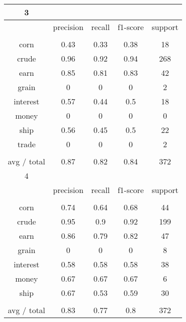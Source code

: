 \documentclass[11pt]{article}
\begin{document}
\begin{center}
\begin{longtable}{| c | c | c | c | c |}
3           &           &        &          &         \\
\hline
           & precision & recall & f1-score & support \\
           &           &        &          &         \\
corn        & 0.43      & 0.33   & 0.38     & 18      \\
crude       & 0.96      & 0.92   & 0.94     & 268     \\
earn        & 0.85      & 0.81   & 0.83     & 42      \\
grain       & 0         & 0      & 0        & 2       \\
interest    & 0.57      & 0.44   & 0.5      & 18      \\
money       & 0         & 0      & 0        & 0       \\
ship        & 0.56      & 0.45   & 0.5      & 22      \\
trade       & 0         & 0      & 0        & 2       \\
           &           &        &          &         \\
avg / total & 0.87      & 0.82   & 0.84     & 372     \\
\hline

4           &           &        &          &         \\
\hline
           & precision & recall & f1-score & support \\
           &           &        &          &         \\
corn        & 0.74      & 0.64   & 0.68     & 44      \\
crude       & 0.95      & 0.9    & 0.92     & 199     \\
earn        & 0.86      & 0.79   & 0.82     & 47      \\
grain       & 0         & 0      & 0        & 8       \\
interest    & 0.58      & 0.58   & 0.58     & 38      \\
money       & 0.67      & 0.67   & 0.67     & 6       \\
ship        & 0.67      & 0.53   & 0.59     & 30      \\
           &           &        &          &         \\
avg / total & 0.83      & 0.77   & 0.8      & 372     \\
\hline


\end{longtable}
\end{center}
\end{document}
